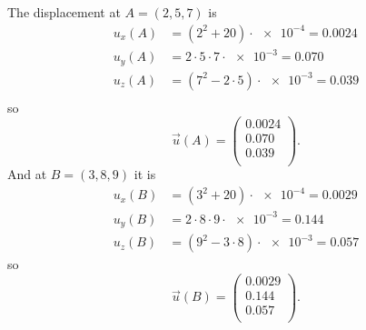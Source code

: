 \begin{derivation}
  The displacement at $A = (2,5,7)$ is
  \begin{align*}
    u_x(A) &= \left( 2^2 + 20 \right)\cdot  \num{e-4} = \num{0.0024}  \\
    u_y(A) &= 2 \cdot 5 \cdot 7 \cdot \num{e-3} = \num{0,070}   \\
    u_z(A) &= (7^2 - 2 \cdot 5) \cdot \num{e-3} = \num{0,039}  \\
  \end{align*}
  so
  \begin{equation*}
    \Vec{u}(A) = \begin{pmatrix}
      \num{0,0024} \\
    \num{0,070} \\
    \num{0,039} \\
    \end{pmatrix}
  .\end{equation*}
  And at $B = (3,8,9)$ it is
  \begin{align*}
    u_x(B) &= (3^2 + 20) \cdot \num{e-4} = \num{0,0029}  \\
    u_y(B) &= 2 \cdot 8 \cdot 9 \cdot \num{e-3} = \num{0,144}  \\
    u_z(B) &= (9^2 - 3 \cdot 8) \cdot \num{e-3} = \num{0,057} 
  \end{align*}
  so
  \begin{equation*}
    \Vec{u}(B) = \begin{pmatrix}
      \num{0,0029} \\
    \num{0,144} \\
    \num{0,057} \\
    \end{pmatrix}
  .\end{equation*}
  

\end{derivation}
